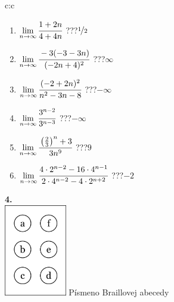 \documentclass[10pt]{report}
\begin{document}
\begin{tabular}{c:c}
\begin{minipage}[c][104.5mm][t]{0.5\linewidth}
\begin{center}
\begin{minipage}{0.79\linewidth}
\begin{center}
\begin{varwidth}{\linewidth}
\begin{enumerate}
\normalsize
\item $\lim\limits_{n\to\infty}\cfrac{1+2n}{4+4n}$\quad \dotfill\; ???\;\dotfill \quad $\nicefrac{1}{2}$
\item $\lim\limits_{n\to\infty}\cfrac{-3(-3-3n)}{(-2n+4)^2}$\quad \dotfill\; ???\;\dotfill \quad $\infty$
\item $\lim\limits_{n\to\infty}\cfrac{(-2+2n)^2}{n^2-3n-8}$\quad \dotfill\; ???\;\dotfill \quad $-\infty$
\item $\lim\limits_{n\to\infty}\cfrac{3^{n-2}}{3^{n-3}}$\quad \dotfill\; ???\;\dotfill \quad $-\infty$
\item $\lim\limits_{n\to\infty}\cfrac{\left(\frac{2}{3}\right)^n +3}{3n^{9}}$\quad \dotfill\; ???\;\dotfill \quad $9$
\item $\lim\limits_{n\to\infty}\cfrac{4\cdot 2^{n-2}-16\cdot 4^{n-1}}{2\cdot 4^{n-2}-4\cdot 2^{n+2}}$\quad \dotfill\; ???\;\dotfill \quad $-2$
\end{enumerate}
\end{varwidth}
\end{center}
\end{minipage}
\begin{minipage}{0.20\linewidth}
\begin{center}
{\Huge\bfseries 4.} \\[2mm]
\includegraphics[height=40mm]{../images/braille.png}
{\small Písmeno Braillovej abecedy}
\end{center}
\end{minipage}
\end{center}
\end{minipage}
%
\end{tabular}
\newpage
\thispagestyle{empty}
\end{document}
